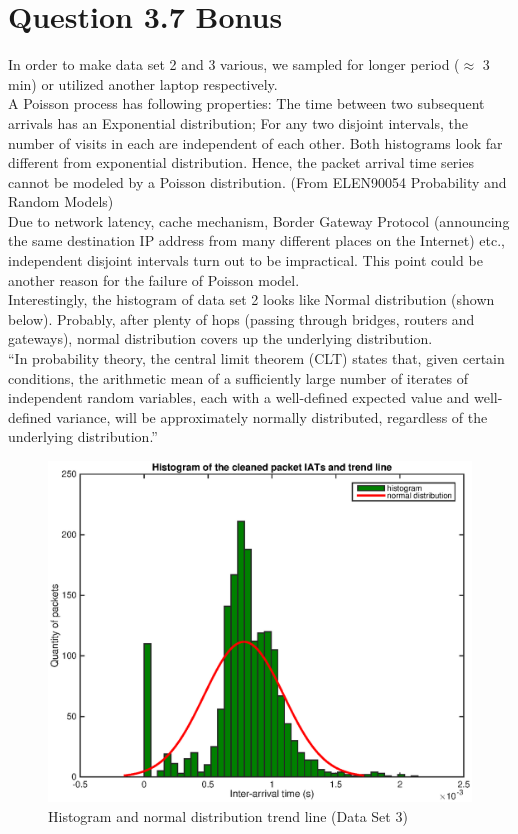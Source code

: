 \documentclass{article}
\newenvironment{homeworkProblem}[1]{
	\section*{#1}
	}{
}
\begin{document}
\begin{homeworkProblem}{Question 3.7 Bonus}
In order to make data set 2 and 3 various, we sampled for longer period ($\approx$ 3 min) or utilized another laptop respectively.\\

A Poisson process has following properties: The time between two subsequent arrivals has an Exponential distribution; For any two disjoint intervals, the number of visits in each are independent of each other. Both histograms look far different from exponential distribution. Hence, the packet arrival time series cannot be modeled by a Poisson distribution. (From ELEN90054 Probability and Random Models)\\

Due to network latency, cache mechanism, Border Gateway Protocol (announcing the same destination IP address from many different places on the Internet) etc., independent disjoint intervals turn out to be impractical. This point could be another reason for the failure of Poisson model.\\

Interestingly, the histogram of data set 2 looks like Normal distribution (shown below). Probably, after plenty of hops (passing through bridges, routers and gateways), normal distribution covers up the underlying distribution.\\

``In probability theory, the central limit theorem (CLT) states that, given certain conditions, the arithmetic mean of a sufficiently large number of iterates of independent random variables, each with a well-defined expected value and well-defined variance, will be approximately normally distributed, regardless of the underlying distribution.''

\begin{figure}[H]
\centering
\includegraphics[width=6in]{img/histogram2-normal.eps}
\caption{Histogram and normal distribution trend line (Data Set 3)}
\end{figure}
\end{homeworkProblem}
\end{document}
